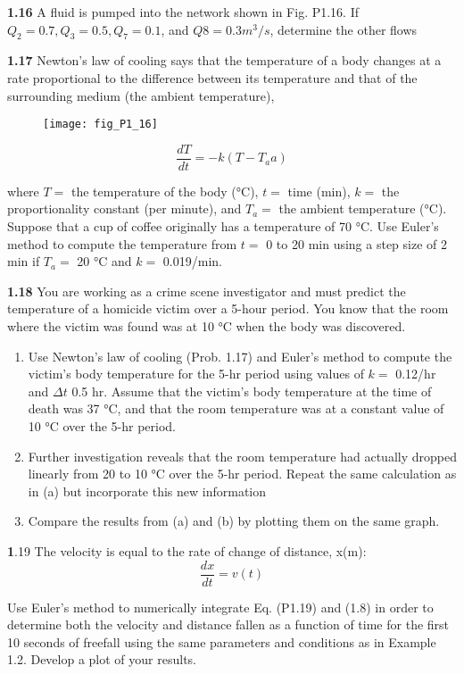 \documentclass[../main.tex]{subfiles}
\begin{document}
\begin{multicols}{2}
\textbf{1.16} A fluid is pumped into the network shown in Fig. P1.16.
If $Q_2 = 0.7, Q_3 = 0.5, Q_7 = 0.1$, and $Q8 = 0.3 m^3/s$, determine
the other flows


\textbf{1.17} Newton's law of cooling says that the temperature of a
body changes at a rate proportional to the difference between
its temperature and that of the surrounding medium (the ambient temperature),
\begin{figure}[H]
	\centering
	\texttt{[image: fig\_P1\_16]}
   
\end{figure}

$$\dfrac{dT}{dt}= -k(T -T_aa)$$

where $T =$ the temperature of the body (°C), $t =$ time (min),
$k =$ the proportionality constant (per minute), and $T_a =$ the
ambient temperature (°C). Suppose that a cup of coffee originally has a temperature of 70 °C. Use Euler's method to
compute the temperature from $t =$ 0 to 20 min using a step
size of 2 min if $T_a =$ 20 °C and $k =$ 0.019/min.

\textbf{1.18} You are working as a crime scene investigator and
must predict the temperature of a homicide victim over a
5-hour period. You know that the room where the victim was
found was at 10 °C when the body was discovered.
\begin{enumerate}[label=(\alph*)]
	\item Use Newton's law of cooling (Prob. 1.17) and Euler's
	method to compute the victim's body temperature for
	the 5-hr period using values of $k=$  0.12/hr and $\Delta t$
	0.5 hr. Assume that the victim's body temperature at
	the time of death was 37 °C, and that the room temperature was at a constant value of 10 °C over the 5-hr
	period.
	\item Further investigation reveals that the room temperature
	had actually dropped linearly from 20 to 10 °C over the
	5-hr period. Repeat the same calculation as in (a) but incorporate this new information
	\item Compare the results from (a) and (b) by plotting them
	on the same graph. 
\end{enumerate}

\textbf1.19 The velocity is equal to the rate of change of distance,
x(m):
$$\dfrac{dx}{dt} = v(t)$$


Use Euler's method to numerically integrate Eq. (P1.19) and
(1.8) in order to determine both the velocity and distance
fallen as a function of time for the first 10 seconds of freefall
using the same parameters and conditions as in Example 1.2.
Develop a plot of your results.


\end{multicols}
\end{document}
